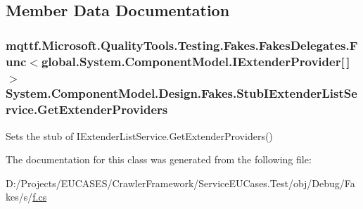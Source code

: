 \subsection{Member Data Documentation}
\hypertarget{class_system_1_1_component_model_1_1_design_1_1_fakes_1_1_stub_i_extender_list_service_a85667565b87ee8d71f5e9a72213b7243}{
\subsubsection[{Get\-Extender\-Providers}]{\setlength{\rightskip}{0pt plus 5cm}mqttf.\-Microsoft.\-Quality\-Tools.\-Testing.\-Fakes.\-Fakes\-Delegates.\-Func$<$global.\-System.\-Component\-Model.\-I\-Extender\-Provider\mbox{[}$\,$\mbox{]}$>$ System.\-Component\-Model.\-Design.\-Fakes.\-Stub\-I\-Extender\-List\-Service.\-Get\-Extender\-Providers}}\label{class_system_1_1_component_model_1_1_design_1_1_fakes_1_1_stub_i_extender_list_service_a85667565b87ee8d71f5e9a72213b7243}


Sets the stub of I\-Extender\-List\-Service.\-Get\-Extender\-Providers()



The documentation for this class was generated from the following file\-:\begin{DoxyCompactItemize}
\item 
D\-:/\-Projects/\-E\-U\-C\-A\-S\-E\-S/\-Crawler\-Framework/\-Service\-E\-U\-Cases.\-Test/obj/\-Debug/\-Fakes/s/\hyperlink{s_2f_8cs}{f.\-cs}\end{DoxyCompactItemize}
